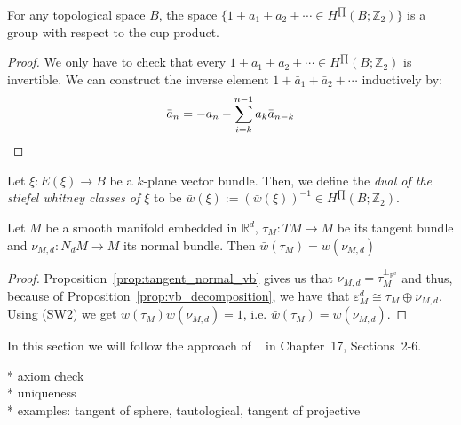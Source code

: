 \begin{lemma} For any topological space $B$, the space $\big\{1+a_1+a_2+\cdots\in H^{\prod}(B;\mathbb{Z}_2)\big\}$ is a group with respect to the cup product.
\end{lemma}
\begin{proof} We only have to check that every $1+a_1+a_2+\cdots\in H^{\prod}(B;\mathbb{Z}_2)$ is invertible. We can construct the inverse element $1+\bar{a}_1+\bar{a}_2+\cdots$ inductively by:
\[\bar{a}_n=-a_n-\sum_{i=k}^{n-1}a_k\bar{a}_{n-k}\qedhere\]
\end{proof}

\begin{definition} Let $\xi:E(\xi)\to B$ be a $k$-plane vector bundle. Then, we define the \emph{dual of the stiefel whitney classes of $\xi$} to be $\bar{w}(\xi):=(\bar{w}(\xi))^{-1}\in H^{\prod}(B;\mathbb{Z}_2)$.
\end{definition}

\begin{proposition} Let $M$ be a smooth manifold embedded in $\mathbb{R}^d$, $\tau_M:TM\to M$ be its tangent bundle and $\nu_{M,d}:N_dM\to M$ its normal bundle. Then $\bar{w}(\tau_M)=w(\nu_{M,d})$
\end{proposition}
\begin{proof} Proposition~\ref{prop:tangent_normal_vb} gives us that $\nu_{M,d}=\tau_M^{\perp_{\mathbb{R}^d}}$ and thus, because of Proposition~\ref{prop:vb_decomposition}, we have that $\varepsilon_M^d\cong\tau_M\oplus\nu_{M,d}$. Using (SW2) we get $w(\tau_M)w(\nu_{M,d})=1$, i.e. $\bar{w}(\tau_M)=w(\nu_{M,d})$.
\end{proof}






In this section we will follow the approach of ~\cite{husemoller} in Chapter~17, Sections~2-6.



* axiom check\\
* uniqueness\\
* examples: tangent of sphere, tautological, tangent of projective




